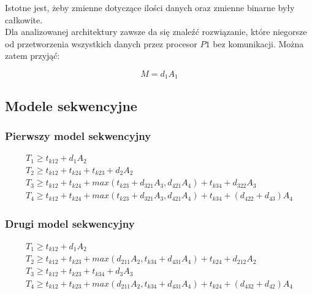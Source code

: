 Istotne jest, żeby zmienne dotyczące ilości danych oraz zmienne binarne były całkowite. \\

Dla analizowanej architektury zawsze da się znaleźć rozwiązanie, które niegorsze od
przetworzenia wszystkich danych przez procesor $P1$ bez komunikacji. Można zatem przyjąć:

\begin{equation} \label{eq:M}
M = d_{1}A_{1}
\end{equation}

\subsection{Modele sekwencyjne}

\subsubsection{Pierwszy model sekwencyjny}

\begin{equation} \label{eq:sek1}
\begin{array}{l}
T_{1} \geq t_{k12} + d_{1}A_{2} \\
T_{2} \geq t_{k12} + t_{k24} + t_{k23} + d_{2}A_{2} \\
T_{3} \geq t_{k12} + t_{k24} + max(t_{k23} + d_{321}A_{3}, d_{421}A_{4}) + t_{k34} + d_{322}A_{3} \\
T_{4} \geq t_{k12} + t_{k24} + max(t_{k23} + d_{321}A_{3}, d_{421}A_{4}) + t_{k34} + (d_{422} + d_{43})A_{4}
\end{array} 
\end{equation}

\subsubsection{Drugi model sekwencyjny}

\begin{equation} \label{eq:sek2}
\begin{array}{l}
T_{1} \geq t_{k12} + d_{1}A_{2} \\
T_{2} \geq t_{k12} + t_{k23} + max(d_{211}A_{2}, t_{k34} + d_{431}A_{4}) + t_{k24} + d_{212}A_{2} \\
T_{3} \geq t_{k12} + t_{k23} + t_{k34} + d_{3}A_{3} \\
T_{4} \geq t_{k12} + t_{k23} + max(d_{211}A_{2}, t_{k34} + d_{431}A_{4}) + t_{k24} + (d_{432} + d_{42})A_{4}
\end{array} 
\end{equation}

